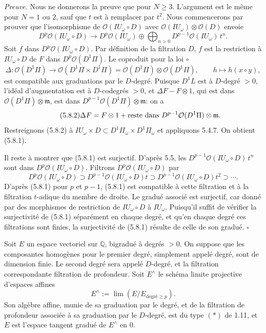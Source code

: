 \documentclass[10pt,a4paper]{article}
\newcommand{\Q}{\mathbb Q}
\newcommand{\OO}{\mathcal O}
\newcommand{\limproj}{\operatorname*{lim}}
\theoremstyle{deligne}
\newenvironment{proofdel}{\textit{Preuve.}}{\hfill$\square$}
\newcommand{\heading}[1]{\vspace{0.65em}\noindent{\bfseries #1}\quad}
\begin{document}
\begin{proofdel}
Nous ne donnerons la preuve que pour \(N\ge3\). L'argument est le même pour \(N=1\) ou \(2\), sauf que \(t\) est à remplacer par \(t^2\). Nous commencerons par prouver que l'isomorphisme de \(\OO(IU_\omega\circ D)\) avec \(\OO(IU_\omega)\otimes\OO(D)\) envoie
\[
\tag{5.8.1}
D^p\OO(IU_\omega\circ D)
\longrightarrow
D^p\OO(IU_\omega)\oplus\bigoplus_{n>0}D^{p-1}\OO(IU_\omega)\,t^n.
\]
Soit \(f\) dans \(D^p\OO(IU_\omega\circ D)\). Par définition de la filtration \(D\), \(f\) est la restriction à \(IU_\omega\circ D\) de \(F\) dans \(D^p\OO(D^1\Pi)\). Le coproduit pour la loi \(\circ\)
\[
\Delta:\OO(D^1\Pi)\longrightarrow\OO(D^1\Pi\times D^1\Pi)
=\OO(D^1\Pi)\otimes\OO(D^1\Pi),\qquad h\longmapsto h(x\circ y),
\]
est compatible aux graduations par le \(D\)-degré. Puisque \(D^1L\) est à \(D\)-degré \(>0\), l'idéal d'augmentation est à \(D\)-codegrés \(>0\), et \(\Delta F-F\otimes1\), qui est dans \(\OO(D^1\Pi)\otimes\mathfrak m\), est dans \(D^{p-1}\OO(D^1\Pi)\otimes\mathfrak m\): on a
\[
\tag{5.8.2}
\Delta F=F\otimes1+\hbox{reste dans }D^{p-1}\OO(D^1\Pi)\otimes\mathfrak m.
\]
Restreignons (5.8.2) à \(IU_\omega\times D\subset D^1\Pi_\omega\times D^1\Pi_\omega\) et appliquons 5.4.7. On obtient (5.8.1).

Il reste à montrer que (5.8.1) est surjectif. D'après 5.5, les \(D^{p-1}\OO(IU_\omega\circ D)\,t^n\) sont dans \(D^p\OO(IU_\omega\circ D)\). Filtrons \(D^p\OO(IU_\omega\circ D)\) par
\[
D^p\OO(IU_\omega\circ D)\supset
D^{p-1}\OO(IU_\omega\circ D)t\supset
D^{p-1}\OO(IU_\omega\circ D)t^2\supset\cdots .
\]
D'après (5.8.1) pour \(p\) et \(p-1\), (5.8.1) est compatible à cette filtration et à la filtration \(t\)-adique du membre de droite. Le gradué associé est surjectif, car donné par des morphismes de restriction de \(IU_\omega\circ D\) à \(IU_\omega\). Puisqu'il suffit de vérifier la surjectivité de (5.8.1) séparément en chaque degré, et qu'en chaque degré ces filtrations sont finies, la surjectivité de (5.8.1) résulte de celle de son gradué.
\end{proofdel}

\heading{5.9.} Soit \(E\) un espace vectoriel sur \(\Q\), bigradué à degrés \(>0\). On suppose que les composantes homogènes pour le premier degré, simplement appelé degré, sont de dimension finie. Le second degré sera appelé \(D\)-degré, et la filtration correspondante filtration de profondeur. Soit \(E^\wedge\) le schéma limite projective d'espaces affines
\[
E^\wedge:=\limproj(E/E_{\mathrm{degré}\ge p}).
\]
Son algèbre affine, munie de sa graduation par le degré, et de la filtration de profondeur associée à sa graduation par le \(D\)-degré, est du type \((*)\) de 1.11, et \(E\) est l'espace tangent gradué de \(E^\wedge\) en \(0\).
\end{document}
